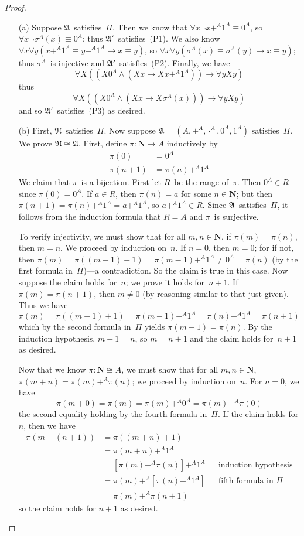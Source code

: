 \documentclass[letterpaper]{article}
\newcommand{\N}{\mathbf{N}}
\newcommand{\lequ}{\equiv}
\newcommand{\limp}{\rightarrow}
\newcommand{\iso}{\cong}
\theoremstyle{remark}
\begin{document}
\begin{proof}
\begin{enumerate}
\item[(a)] Suppose $\mathfrak{A}$~satisfies~$\Pi$. Then we know that $\forall x\lnot x+^A1^A\lequ0^A$, so $\forall x\lnot\sigma^A(x)\lequ0^A$; thus $\mathfrak{A}'$~satisfies~(P1). We also know $\forall x\forall y(x+^A1^A\lequ y+^A1^A\limp x\lequ y)$, so $\forall x\forall y(\sigma^A(x)\lequ\sigma^A(y)\limp x\lequ y)$; thus $\sigma^A$~is injective and $\mathfrak{A}'$~satisfies~(P2). Finally, we have
$$\forall X((X0^A\land(Xx\limp Xx+^A1^A))\limp\forall y Xy)$$
thus
$$\forall X((X0^A\land(Xx\limp X\sigma^A(x)))\limp\forall y Xy)$$
and so $\mathfrak{A}'$~satisfies~(P3) as desired.
\item[(b)] First, $\mathfrak{N}$~satisfies~$\Pi$. Now suppose $\mathfrak{A}=(A,+^A,\cdot^A,0^A,1^A)$ satisfies~$\Pi$. We prove $\mathfrak{N}\iso\mathfrak{A}$. First, define $\pi:\N\to A$ inductively by
\begin{align*}
\pi(0)&=0^A\\
\pi(n+1)&=\pi(n)+^A1^A
\end{align*}
We claim that $\pi$~is a bijection. First let $R$~be the range of~$\pi$. Then $0^A\in R$ since $\pi(0)=0^A$. If $a\in R$, then $\pi(n)=a$ for some $n\in\N$; but then $\pi(n+1)=\pi(n)+^A1^A=a+^A1^A$, so $a+^A1^A\in R$. Since $\mathfrak{A}$~satisfies~$\Pi$, it follows from the induction formula that $R=A$ and $\pi$~is surjective.

To verify injectivity, we must show that for all $m,n\in\N$, if $\pi(m)=\pi(n)$, then $m=n$. We proceed by induction on~$n$. If $n=0$, then $m=0$; for if not, then $\pi(m)=\pi((m-1)+1)=\pi(m-1)+^A1^A\ne0^A=\pi(n)$ (by the first formula in~$\Pi$)---a contradiction. So the claim is true in this case. Now suppose the claim holds for~$n$; we prove it holds for~$n+1$. If $\pi(m)=\pi(n+1)$, then $m\ne0$ (by reasoning similar to that just given). Thus we have
$$\pi(m)=\pi((m-1)+1)=\pi(m-1)+^A1^A=\pi(n)+^A1^A=\pi(n+1)$$
which by the second formula in~$\Pi$ yields $\pi(m-1)=\pi(n)$. By the induction hypothesis, $m-1=n$, so $m=n+1$ and the claim holds for~$n+1$ as desired.

Now that we know $\pi:\N\iso A$, we must show that for all $m,n\in\N$, $\pi(m+n)=\pi(m)+^A\pi(n)$; we proceed by induction on~$n$. For $n=0$, we have
$$\pi(m+0)=\pi(m)=\pi(m)+^A0^A=\pi(m)+^A\pi(0)$$
the second equality holding by the fourth formula in~$\Pi$. If the claim holds for $n$, then we have
\begin{align*}
\pi(m+(n+1))&=\pi((m+n)+1)&&\\
            &=\pi(m+n)+^A1^A&&\\
            &=[\pi(m)+^A\pi(n)]+^A1^A&&\text{induction hypothesis}\\
            &=\pi(m)+^A[\pi(n)+^A1^A]&&\text{fifth formula in~$\Pi$}\\
            &=\pi(m)+^A\pi(n+1)
\end{align*}
so the claim holds for $n+1$ as desired.


\end{enumerate}
\end{proof}
\end{document}
